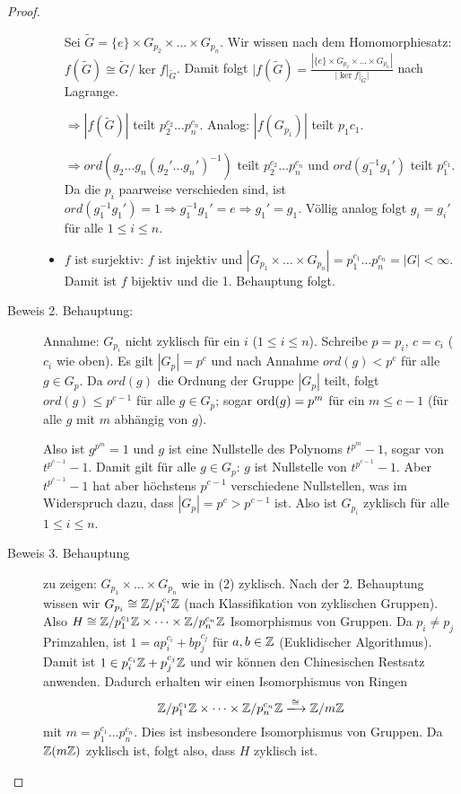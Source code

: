 \documentclass[12pt,a4paper]{scrartcl}
\begin{document}
\begin{proof}
\begin{description}
\begin{itemize}
			Sei $\tilde{G} = \{e\}\times G_{p_2}\times\dots\times G_{p_n}$.  Wir wissen nach dem Homomorphiesatz: $f(\tilde{G})\cong \tilde {G}/\ker f|_{\tilde{G}}$. Damit folgt $|f(\tilde{G}) = \frac{|\{e\}\times G_{p_2}\times\dots\times G_{p_n}|}{|\ker f|_{\tilde{G}}|}$ nach Lagrange.
			
			$\Rightarrow |f(\tilde{G})|$ teilt $p_2^{c_2}\dots p_n^{c_n}$. Analog: $|f(G_{p_1})|$ teilt $p_1{c_1}$. 
			
			$\Rightarrow ord (g_2\dots g_n(g_2'\dots g_n')^{-1})$ teilt $p_2^{c_2}\dots p_n^{c_n}$ und $ord(g_1^{-1}g_1')$ teilt $p_1^{c_1}$. Da die $p_i$ paarweise verschieden sind, ist $ord(g_1^{-1}g_1') = 1\Rightarrow g_1^{-1}g_1' = e\Rightarrow g_1' = g_1$. Völlig analog folgt $g_i = g_i'$ für alle $1\leq i\leq n$.
			\item $f$ ist surjektiv: $f$ ist injektiv und $|G_{p_1}\times\dots\times G_{p_n}| = p_1^{c_1}\dots p_n^{c_n} = |G|<\infty$. Damit ist $f$ bijektiv und die 1. Behauptung folgt.
		\end{itemize}
	\item[Beweis 2. Behauptung:] Annahme: $G_{p_i}$ nicht zyklisch für ein $i$ ($1\leq i\leq n$). Schreibe $p = p_i$, $c = c_i$ ($c_i$ wie oben). Es gilt $|G_p| = p^c$ und nach Annahme $ord(g)<p^c$ für alle $g\in G_p$. Da $ord(g)$ die Ordnung der Gruppe $|G_p|$ teilt, folgt $ord(g)\leq p^{c-1}$ für alle $g\in G_p$; sogar $\operatorname{ord}(g) = p^m$ für ein $m\leq c-1$ (für alle $g$ mit $m$ abhängig von $g$).
	
	Also ist $g^{p^m} = 1$ und $g$ ist eine Nullstelle des Polynoms $t^{p^m}-1$, sogar von $t^{p^{c-1}}-1$. Damit gilt für alle $g\in G_p$: $g$ ist Nullstelle von $t^{p^{c-1}}-1$. Aber $t^{p^{c-1}}-1$ hat aber höchstens $p^{c-1}$ verschiedene Nullstellen, was im Widerspruch dazu, dass $|G_p| = p^c> p^{c-1}$ ist. Also ist $G_{p_i}$ zyklisch für alle $1\leq i\leq n$.
	\item[Beweis 3. Behauptung] zu zeigen: $G_{p_1}\times\dots\times G_{p_n}$ wie in (2) zyklisch. Nach der 2. Behauptung wissen wir $G_{p_i}\cong \mathbb Z/p_i^{c_i}\mathbb Z$ (nach Klassifikation von zyklischen Gruppen). Also $H\cong \mathbb Z/p_1^{c_1} \mathbb Z\times\dots \times \mathbb Z/p_n^{c_n}\mathbb Z$ Isomorphismus von Gruppen. Da $p_i\neq p_j$ Primzahlen, ist $1 = ap_i^{c_i}+bp_j^{c_j}$ für $a,b\in\mathbb Z$ (Euklidischer Algorithmus). Damit ist $1\in p_i^{c_i}\mathbb Z+p_j^{c_j}\mathbb Z$ und wir können den Chinesischen Restsatz anwenden. Dadurch erhalten wir einen Isomorphismus von Ringen
	$$\IZ/p_1^{c_1}\IZ\times\dots \times\IZ/p_n^{c_n}\IZ \xlongrightarrow{\cong} \IZ/m\IZ$$
	mit $m = p_1^{c_1}\dots p_n^{c_n}$. Dies ist insbesondere Isomorphismus von Gruppen. Da $\mathbb Z(m\mathbb Z)$ zyklisch ist, folgt also, dass $H$ zyklisch ist.
\end{description}
\end{proof}
\end{document}
